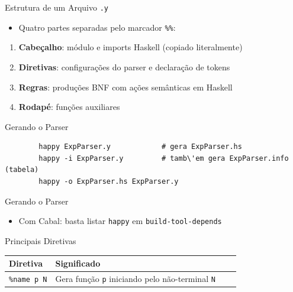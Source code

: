 \begin{frame}[fragile]{Estrutura de um Arquivo
    \texttt{.y}}

    \begin{itemize}

        \item
        Quatro partes separadas pelo marcador \texttt{\%\%}:
    \end{itemize}

    \begin{enumerate}

        \item
        \textbf{Cabeçalho}: módulo e imports Haskell (copiado literalmente)
        \item
        \textbf{Diretivas}: configurações do parser e declaração de tokens
        \item
        \textbf{Regras}: produções BNF com ações semânticas em Haskell
        \item
        \textbf{Rodapé}: funções auxiliares
    \end{enumerate}
\end{frame}

\begin{frame}[fragile]{Gerando o Parser}

    \begin{lstlisting}
        happy ExpParser.y            # gera ExpParser.hs
        happy -i ExpParser.y         # tamb\'em gera ExpParser.info (tabela)
        happy -o ExpParser.hs ExpParser.y
    \end{lstlisting}
\end{frame}

\begin{frame}[fragile]{Gerando o Parser}

    \begin{itemize}

        \item
        Com Cabal: basta listar \texttt{happy} em
        \texttt{build-tool-depends}
    \end{itemize}
\end{frame}



\begin{frame}[fragile]{Principais Diretivas}

    \begin{table}
        \begin{tabular}{l l l l}
            \hline
            Diretiva & Significado \\
            \hline
            \texttt{\%name p N} & Gera função
            \texttt{p} iniciando pelo não-terminal
            \texttt{N} \\
            \hline
        \end{tabular}
    \end{table}
\end{frame}

